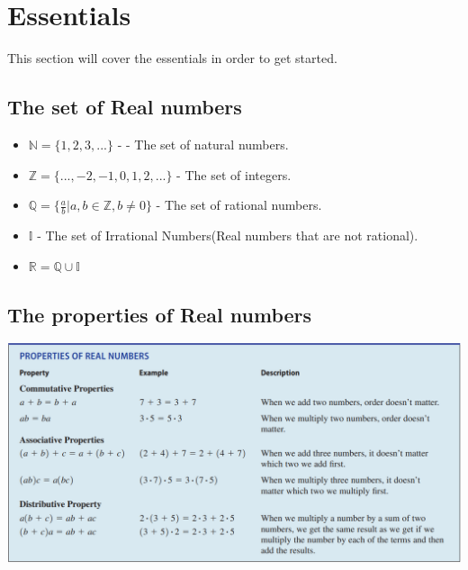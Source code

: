 \section{Essentials}
This section will cover the essentials in order to get started. 
\subsection{The set of Real numbers}
\begin{itemize}
    \item $\mathbb{N} = \{1, 2, 3, ...\}$ - - The set of natural numbers. 
    \item $\mathbb{Z} = \{..., -2, -1, 0, 1, 2, ...\}$ - The set of integers.
    \item $\mathbb{Q} = \{\frac{a}{b} | a, b \in \mathbb{Z}, b \neq 0\}$ - The set of rational numbers. 
    \item $\mathbb{I}$ - The set of Irrational Numbers(Real numbers that are not rational). 
    \item $\mathbb{R} = \mathbb{Q} \cup \mathbb{I}$
\end{itemize}


\subsection{The properties of Real numbers}
\includegraphics[width=1.1\textwidth]{algebra-pre-calculus/essentials/properties.png}

